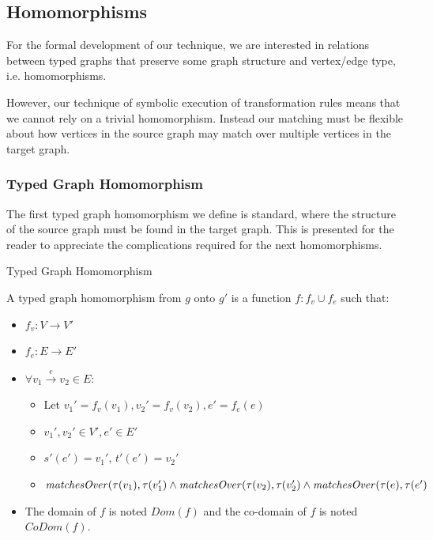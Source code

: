 

\subsection{Homomorphisms}
\label{subsec:homomorphisms}


For the formal development of our technique, we are interested in relations between typed graphs that preserve some graph structure and vertex/edge type, i.e. homomorphisms.

However, our technique of symbolic execution of transformation rules means that we cannot rely on a trivial homomorphism. Instead our matching must be flexible about how vertices in the source graph may match over multiple vertices in the target graph.

\subsubsection*{Typed Graph Homomorphism}

The first typed graph homomorphism we define is standard, where the structure of the source graph must be found in the target graph. This is presented for the reader to appreciate the complications required for the next homomorphisms.


\begin{definition}{Typed Graph Homomorphism\\}
\label{def:typed_graph_homomorphism}

A typed graph homomorphism from $g$ onto $g'$ is a function $f: f_v \cup f_e$ such that:
\begin{itemize}
\item $f_v: V\rightarrow V'$
\item $f_e: E\rightarrow E'$
\item $\forall v_1 \xrightarrow{e} v_2\in E$:
\begin{itemize}
\item Let $ v_1' = f_v(v_1), v_2' = f_v(v_2), e' = f_e(e)$
\item $v_1', v_2' \in V', e' \in E'$
\item $s'(e') = v_1'$, $t'(e') = v_2'$
\item $\mathit{matchesOver}(\tau(v_1), \tau(v_1') \land \\\mathit{matchesOver}(\tau(v_2), \tau(v_2') \land\\ \mathit{matchesOver}(\tau(e), \tau(e')$
\end{itemize}

\item The domain of $f$ is noted $Dom(f)$ and the co-domain of $f$ is noted $CoDom(f)$.
\end{itemize}  
\end{definition}

